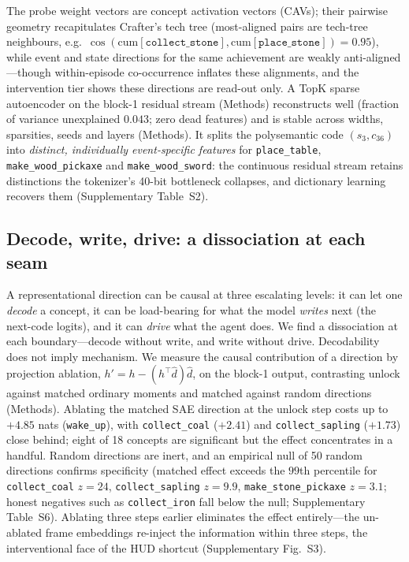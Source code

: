 \documentclass[pdflatex,sn-mathphys-num]{sn-jnl}%
\theoremstyle{thmstyleone}%
\theoremstyle{thmstyletwo}%
\theoremstyle{thmstylethree}%
\newcommand{\code}[2]{(s_{#1},c_{#2})}
\newcommand{\achname}[1]{\texttt{#1}}
\begin{document}
The probe weight vectors are concept activation vectors (CAVs); their pairwise geometry recapitulates Crafter's tech tree (most-aligned pairs are tech-tree neighbours, e.g.\ $\cos(\mathrm{cum}[\achname{collect\_stone}],\mathrm{cum}[\achname{place\_stone}]){=}0.95$), while event and state directions for the same achievement are weakly anti-aligned---though within-episode co-occurrence inflates these alignments, and the intervention tier shows these directions are read-out only. A TopK sparse autoencoder on the block-1 residual stream (Methods) reconstructs well (fraction of variance unexplained $0.043$; zero dead features) and is stable across widths, sparsities, seeds and layers (Methods). It splits the polysemantic code $\code{3}{36}$ into \emph{distinct, individually event-specific features} for \achname{place\_table}, \achname{make\_wood\_pickaxe} and \achname{make\_wood\_sword}: the continuous residual stream retains distinctions the tokenizer's 40-bit bottleneck collapses, and dictionary learning recovers them (Supplementary Table~S2).

\subsection{Decode, write, drive: a dissociation at each seam}\label{sec:res-readwrite}
A representational direction can be causal at three escalating levels: it can let one \emph{decode} a concept, it can be load-bearing for what the model \emph{writes} next (the next-code logits), and it can \emph{drive} what the agent does. We find a dissociation at each boundary---decode without write, and write without drive. Decodability does not imply mechanism. We measure the causal contribution of a direction by projection ablation, $h' = h - (h^\top\hat d)\hat d$, on the block-1 output, contrasting unlock against matched ordinary moments and matched against random directions (Methods). Ablating the matched SAE direction at the unlock step costs up to $+4.85$ nats (\achname{wake\_up}), with \achname{collect\_coal} ($+2.41$) and \achname{collect\_sapling} ($+1.73$) close behind; eight of 18 concepts are significant but the effect concentrates in a handful. Random directions are inert, and an empirical null of 50 random directions confirms specificity (matched effect exceeds the $99$th percentile for \achname{collect\_coal} $z{=}24$, \achname{collect\_sapling} $z{=}9.9$, \achname{make\_stone\_pickaxe} $z{=}3.1$; honest negatives such as \achname{collect\_iron} fall below the null; Supplementary Table~S6). Ablating three steps earlier eliminates the effect entirely---the un-ablated frame embeddings re-inject the information within three steps, the interventional face of the HUD shortcut (Supplementary Fig.~S3).
\end{document}
